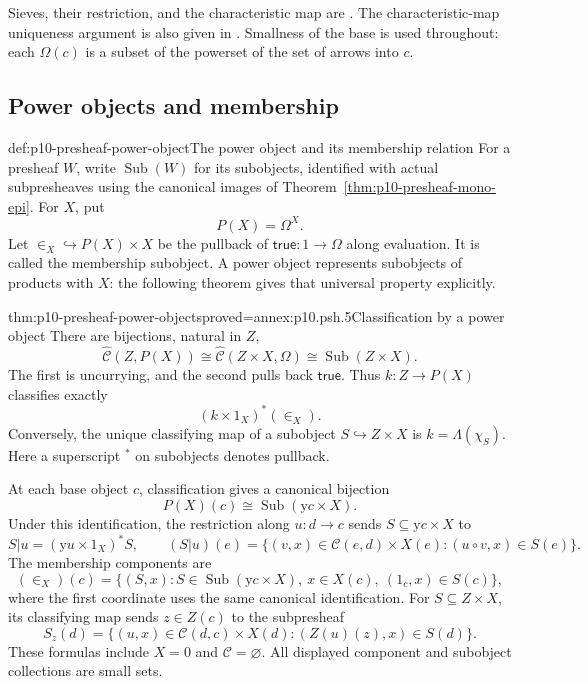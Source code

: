 Sieves, their restriction, and the characteristic map are
\cite[I\S4, pp.~37--38, formulas (2)--(8)]{MacLaneMoerdijk1992}.
The characteristic-map uniqueness argument is also given in
\cite[\S1, pp.~6--7]{MoerdijkVanOosten2007Topos}.
Smallness of the base is used throughout: each \(\Omega(c)\)
is a subset of the powerset of the set of arrows into \(c\).

\subsection{Power objects and membership}
\label{sec:p10-presheaf-power-objects}

\begin{hbdefinition}{def:p10-presheaf-power-object}{The power object and its membership relation}
For a presheaf \(W\), write \(\operatorname{Sub}(W)\) for its
subobjects, identified with actual subpresheaves using the
canonical images of
Theorem~\ref{thm:p10-presheaf-mono-epi}.
For \(X\), put
\[
                              P(X)=\Omega^X .
\]
Let \(\in_X\hookrightarrow P(X)\times X\) be the pullback
of \(\mathsf{true}:1\to\Omega\) along evaluation.
It is called the membership subobject.
A power object represents subobjects of products with \(X\):
the following theorem gives that universal property explicitly.
\end{hbdefinition}

\begin{hbtheorem}{thm:p10-presheaf-power-objects}{proved=annex:p10.psh.5}{Classification by a power object}
There are bijections, natural in \(Z\),
\[
 \widehat{\mathcal C}(Z,P(X))
       \cong\widehat{\mathcal C}(Z\times X,\Omega)
       \cong\operatorname{Sub}(Z\times X).
\]
The first is uncurrying, and the second pulls back
\(\mathsf{true}\).  Thus \(k:Z\to P(X)\) classifies exactly
\[
                              (k\times1_X)^*(\in_X).
\]
Conversely, the unique classifying map of a subobject
\(S\hookrightarrow Z\times X\) is \(k=\Lambda(\chi_S)\).
Here a superscript \({}^*\) on subobjects denotes pullback.

At each base object \(c\), classification gives a canonical bijection
\[
                       P(X)(c)\cong
                       \operatorname{Sub}(\mathrm y c\times X).
\]
Under this identification, the restriction along \(u:d\to c\)
sends \(S\subseteq\mathrm y c\times X\) to
\[
 S|u=(\mathrm y u\times1_X)^*S,\qquad
 (S|u)(e)=\{(v,x)\in\mathcal C(e,d)\times X(e):
                                      (u\circ v,x)\in S(e)\}.
\]
The membership components are
\[
 (\in_X)(c)=
   \{(S,x):S\in\operatorname{Sub}(\mathrm y c\times X),\
                         x\in X(c),\ (1_c,x)\in S(c)\},
\]
where the first coordinate uses the same canonical identification.
For \(S\subseteq Z\times X\), its classifying map sends
\(z\in Z(c)\) to the subpresheaf
\[
        S_z(d)=\{(u,x)\in\mathcal C(d,c)\times X(d):
                                      (Z(u)(z),x)\in S(d)\}.
\]
These formulas include \(X=0\) and \(\mathcal C=\varnothing\).
All displayed component and subobject collections are small sets.
\end{hbtheorem}

